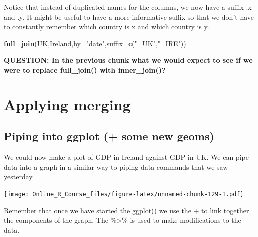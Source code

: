 \documentclass[]{book}
\newenvironment{Shaded}{\begin{snugshade}}{\end{snugshade}}
\newcommand{\DataTypeTok}[1]{\textcolor[rgb]{0.13,0.29,0.53}{#1}}
\newcommand{\KeywordTok}[1]{\textcolor[rgb]{0.13,0.29,0.53}{\textbf{#1}}}
\newcommand{\NormalTok}[1]{#1}
\newcommand{\OperatorTok}[1]{\textcolor[rgb]{0.81,0.36,0.00}{\textbf{#1}}}
\newcommand{\StringTok}[1]{\textcolor[rgb]{0.31,0.60,0.02}{#1}}
\begin{document}
Notice that instead of duplicated names for the columns, we now have a suffix .x and .y. It might be useful to have a more informative suffix so that we don't have to constantly remember which country is x and which country is y.

\begin{Shaded}
\begin{Highlighting}[]
\KeywordTok{full_join}\NormalTok{(UK,Ireland,}\DataTypeTok{by=}\StringTok{"date"}\NormalTok{,}\DataTypeTok{suffix=}\KeywordTok{c}\NormalTok{(}\StringTok{"_UK"}\NormalTok{,}\StringTok{"_IRE"}\NormalTok{))}
\end{Highlighting}
\end{Shaded}

\textbf{QUESTION: In the previous chunk what we would expect to see if we were to replace full\_join() with inner\_join()?}

\hypertarget{applying-merging}{%
\section{Applying merging}\label{applying-merging}}

\hypertarget{piping-into-ggplot-some-new-geoms}{%
\subsection{Piping into ggplot (+ some new geoms)}\label{piping-into-ggplot-some-new-geoms}}

We could now make a plot of GDP in Ireland against GDP in UK. We can pipe data into a graph in a similar way to piping data commands that we saw yesterday.

\begin{Shaded}
\end{Shaded}

\texttt{[image: Online\_R\_Course\_files/figure-latex/unnamed-chunk-129-1.pdf]}

Remember that once we have started the ggplot() we use the + to link together the components of the graph. The \%\textgreater{}\% is used to make modifications to the data.
\end{document}
